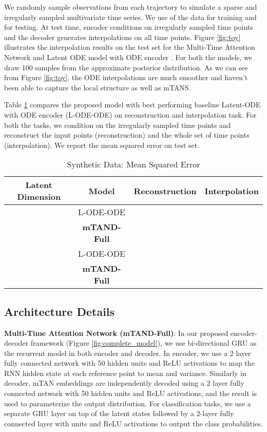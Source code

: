 \documentclass{article} \usepackage{iclr2021_conference,times}
\begin{document}
We randomly sample  observations from each trajectory to simulate a sparse and irregularly sampled multivariate time series. We use  of the data for training and  for testing. At test time, encoder conditions on  irregularly sampled time points and the decoder generates interpolations on all  time points.  Figure \ref{fig:toy} illustrates the interpolation results on the test set for the Multi-Time Attention Network and Latent ODE model with ODE encoder \citep{Rubanova2019}. For both the models, we draw 100 samples from the approximate posterior distribution. As we can see from Figure \ref{fig:toy}, the ODE interpolations are much smoother and haven't been able to capture the local structure as well as mTANS.

Table \ref{table:syn_dataset} compares the proposed model with best performing baseline Latent-ODE with ODE encoder (L-ODE-ODE) on reconstruction and interpolation task. For both the tasks, we condition on the  irregularly sampled time points and reconstruct the input points (reconstruction) and the whole set of  time points (interpolation). We report the mean squared error on test set.


\begin{table}[t]
\centering
    \caption{Synthetic Data: Mean Squared Error}
    \label{table:syn_dataset}
        \begin{tabular}[h]{c c c c}
         \toprule
  {\bf Latent Dimension} &   {\bf Model} &     {\bf Reconstruction} & {\bf Interpolation} \\
         \midrule
  \multirow{2}{*}{} &   {L-ODE-ODE} &      &      \\
  	&   {\bf mTAND-Full} &   &    \\ \midrule
   \multirow{2}{*}{} &   {L-ODE-ODE} &      &      \\
   	&  {\bf mTAND-Full} &   &    \\
            \bottomrule
            \end{tabular}  
           \end{table}




\subsection{Architecture Details}




\label{sec:arch}
{\bf Multi-Time Attention Network (mTAND-Full)}: 
In our proposed encoder-decoder framework (Figure \ref{fig:complete_model}), we use bi-directional GRU as the recurrent model in both encoder and decoder. In encoder, we use a 2 layer fully connected network with 50 hidden units and ReLU activations to map the RNN hidden state at each reference point to mean and variance. Similarly in decoder, mTAN embeddings are independently decoded using a 2 layer fully connected network with 50 hidden units and ReLU activations, and the result is used to parameterize the output distribution. For classification tasks, we use a separate GRU layer on top of the latent states followed by a 2-layer fully connected layer with  units and ReLU activations to output the class probabilities.  
\end{document}

